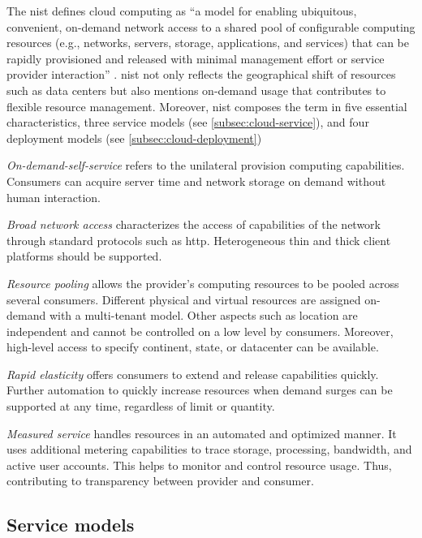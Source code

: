 The \ac{nist} defines cloud computing as \enquote{a model for enabling ubiquitous, convenient, on-demand network access to a shared pool of configurable computing resources (e.g., networks, servers, storage, applications, and services) that can be rapidly provisioned and released with minimal management effort or service provider interaction} \cite{Mell2011}.
\ac{nist} not only reflects the geographical shift of resources such as data centers but also mentions on-demand usage that contributes to flexible resource management.
Moreover, \ac{nist} composes the term in five essential characteristics, three service models (see \autoref{subsec:cloud-service}), and four deployment models (see \autoref{subsec:cloud-deployment}) \cite{Mell2011}

\textit{On-demand-self-service} refers to the unilateral provision computing capabilities.
Consumers can acquire server time and network storage on demand without human interaction.

\textit{Broad network access} characterizes the access of capabilities of the network through standard protocols such as \acs{http}.
Heterogeneous thin and thick client platforms should be supported.

\textit{Resource pooling} allows the provider's computing resources to be pooled across several consumers.
Different physical and virtual resources are assigned on-demand with a multi-tenant model.
Other aspects such as location are independent and cannot be controlled on a low level by consumers.
Moreover, high-level access to specify continent, state, or datacenter can be available.

\textit{Rapid elasticity} offers consumers to extend and release capabilities quickly.
Further automation to quickly increase resources when demand surges can be supported at any time, regardless of limit or quantity.

\textit{Measured service} handles resources in an automated and optimized manner.
It uses additional metering capabilities to trace storage, processing, bandwidth, and active user accounts.
This helps to monitor and control resource usage.
Thus, contributing to transparency between provider and consumer.

\subsection{Service models}
\label{subsec:cloud-service}

